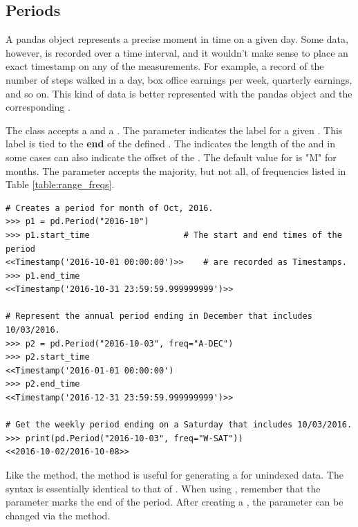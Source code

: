 \subsection*{Periods} %

A pandas  object represents a precise moment in time on a given day.
Some data, however, is recorded over a time interval, and it wouldn't make sense to place an exact timestamp on any of the measurements.
For example, a record of the number of steps walked in a day, box office earnings per week, quarterly earnings, and so on.
This kind of data is better represented with the pandas  object and the corresponding .

The  class accepts a  and a .
The  parameter indicates the label for a given .
This label is tied to the \textbf{end} of the defined .
The  indicates the length of the  and in some cases can also indicate the offset of the .
The default value for  is "M" for months.
The  parameter accepts the majority, but not all, of frequencies listed in Table \ref{table:range_freqs}.

\begin{lstlisting}
# Creates a period for month of Oct, 2016.
>>> p1 = pd.Period("2016-10")
>>> p1.start_time                   # The start and end times of the period
<<Timestamp('2016-10-01 00:00:00')>>    # are recorded as Timestamps.
>>> p1.end_time
<<Timestamp('2016-10-31 23:59:59.999999999')>>

# Represent the annual period ending in December that includes 10/03/2016.
>>> p2 = pd.Period("2016-10-03", freq="A-DEC")
>>> p2.start_time
<<Timestamp('2016-01-01 00:00:00')
>>> p2.end_time
<<Timestamp('2016-12-31 23:59:59.999999999')>>

# Get the weekly period ending on a Saturday that includes 10/03/2016.
>>> print(pd.Period("2016-10-03", freq="W-SAT"))
<<2016-10-02/2016-10-08>>
\end{lstlisting}

Like the  method, the  method is useful for generating a  for unindexed data.
The syntax is essentially identical to that of .
When using , remember that the  parameter marks the end of the period.
After creating a , the  parameter can be changed via the  method.


